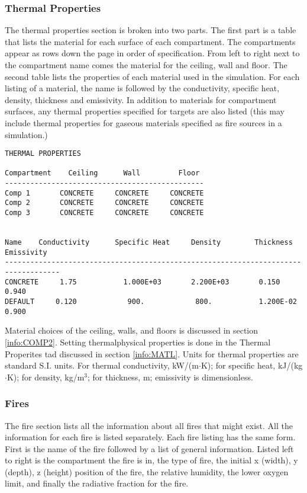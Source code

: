 \subsubsection{Thermal Properties}

The thermal properties section is broken into two parts.  The first part is a table that lists the material for each surface of each compartment.  The compartments appear as rows down the page in order of specification.  From left to right next to the compartment name comes the material for the ceiling, wall and floor.  The second table lists the properties of each material used in the simulation. For each listing of a material, the name is followed by the conductivity, specific heat, density, thickness and emissivity. In addition to materials for compartment surfaces, any thermal properties specified for targets are also listed (this may include thermal properties for gaseous materials specified as fire sources in a simulation.)

\begin{lstlisting}[basicstyle=\tiny]
THERMAL PROPERTIES

Compartment    Ceiling      Wall         Floor
-----------------------------------------------
Comp 1       CONCRETE     CONCRETE     CONCRETE
Comp 2       CONCRETE     CONCRETE     CONCRETE
Comp 3       CONCRETE     CONCRETE     CONCRETE


Name    Conductivity      Specific Heat     Density        Thickness     Emissivity
-----------------------------------------------------------------------------------
CONCRETE     1.75           1.000E+03       2.200E+03       0.150           0.940
DEFAULT     0.120            900.            800.           1.200E-02       0.900   
\end{lstlisting}

Material choices of the ceiling, walls, and floors is discussed in section \ref{info:COMP2}. Setting thermalphysical properties is done in the Thermal Properites tad discussed in section \ref{info:MATL}. Units for thermal properties are standard S.I. units.  For thermal conductivity,  kW/(m$\cdot$K); for specific heat,  kJ/(kg$\cdot$K); for density, kg/m$^3$; for thickness, m; emissivity is dimensionless.


\subsubsection{Fires}

The fire section lists all the information about all fires that might exist.  All the information for each fire is listed separately.   Each fire listing has the same form.  First is the name of the fire followed by a list of general information.  Listed left to right is the compartment the fire is in, the type of fire, the initial x (width), y (depth), z (height) position of the fire, the relative humidity, the lower oxygen limit, and finally the radiative fraction for the fire.

